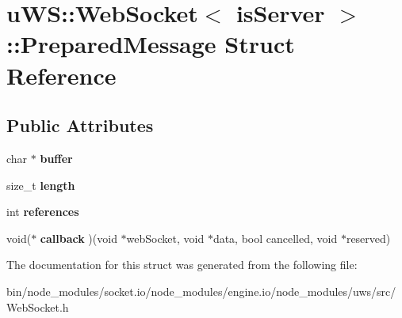 \hypertarget{structu_w_s_1_1_web_socket_1_1_prepared_message}{}\section{u\+WS\+:\+:Web\+Socket$<$ is\+Server $>$\+:\+:Prepared\+Message Struct Reference}
\label{structu_w_s_1_1_web_socket_1_1_prepared_message}
\subsection*{Public Attributes}
\begin{DoxyCompactItemize}
\item 
\mbox{\label{structu_w_s_1_1_web_socket_1_1_prepared_message_a5abc7536cb2f87dd2719e87778da7383}} 
char $\ast$ {\bfseries buffer}
\item 
\mbox{\label{structu_w_s_1_1_web_socket_1_1_prepared_message_a9ca9b2746665734b48b79d536740f201}} 
size\+\_\+t {\bfseries length}
\item 
\mbox{\label{structu_w_s_1_1_web_socket_1_1_prepared_message_afc12808c09f41014662eb9b5281f3f74}} 
int {\bfseries references}
\item 
\mbox{\label{structu_w_s_1_1_web_socket_1_1_prepared_message_a5fa95fbede72cbe02fa1c42dbddd4854}} 
void($\ast$ {\bfseries callback} )(void $\ast$web\+Socket, void $\ast$data, bool cancelled, void $\ast$reserved)
\end{DoxyCompactItemize}


The documentation for this struct was generated from the following file\+:\begin{DoxyCompactItemize}
\item 
bin/node\+\_\+modules/socket.\+io/node\+\_\+modules/engine.\+io/node\+\_\+modules/uws/src/Web\+Socket.\+h\end{DoxyCompactItemize}
